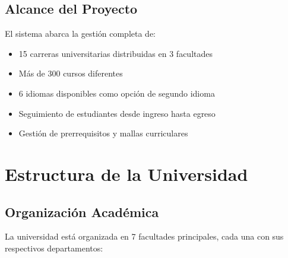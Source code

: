 \documentclass[12pt,a4paper]{article}
\begin{document}
	\subsection{Alcance del Proyecto}
	El sistema abarca la gestión completa de:
	\begin{itemize}
		\item 15 carreras universitarias distribuidas en 3 facultades
		\item Más de 300 cursos diferentes
		\item 6 idiomas disponibles como opción de segundo idioma
		\item Seguimiento de estudiantes desde ingreso hasta egreso
		\item Gestión de prerrequisitos y mallas curriculares
	\end{itemize}
	
	\newpage
	
	\section{Estructura de la Universidad}
	
	\subsection{Organización Académica}
	
	La universidad está organizada en 7 facultades principales, cada una con sus respectivos departamentos:
	
	\vspace{1cm}
	
\end{document}
